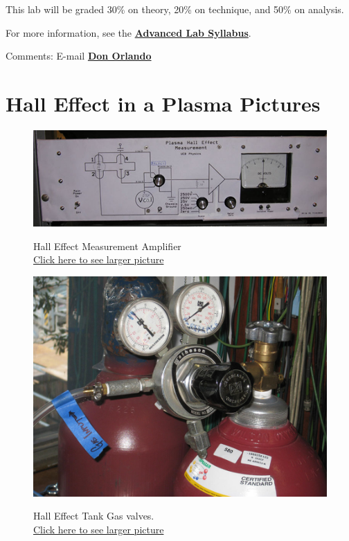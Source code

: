 \documentclass{../lab}
\begin{document}
This lab will be graded 30\% on theory, 20\% on technique, and 50\% on analysis.

For more information, see the \href{\AdvancedLabSyllabus}{\textbf{Advanced Lab Syllabus}}.

Comments: E-mail \href{\MailDonOrlando}{\textbf{Don Orlando}}

\section{Hall Effect in a Plasma Pictures}
\noindent
\begin{figure}[H]
\captionsetup{justification=centering}
  \href{http://experimentationlab.berkeley.edu/sites/default/files/images/HAL_0152B.jpg}{\includegraphics[width=\linewidth,keepaspectratio]{images/HAL_0152B.jpg}}
  \caption{Hall Effect Measurement Amplifier \\
  \href{http://experimentationlab.berkeley.edu/sites/default/files/images/HAL_0152B.jpg}{Click here to see larger picture}}
  \label{fig:HAL_0152B.jpg}
\endminipage\hfill
{}
  \href{http://experimentationlab.berkeley.edu/sites/default/files/images/HAL_Gas-Valves_3532-Lg.jpg}{\includegraphics[width=\linewidth,keepaspectratio]{images/HAL_Gas-Valves_3532-Lg.jpg}}
  \caption{Hall Effect Tank Gas valves. \\ \href{http://experimentationlab.berkeley.edu/sites/default/files/images/HAL_Gas-Valves_3532-Lg.jpg}{Click here to see larger picture}}\label{fig:HAL_Gas-Valves_3532-Lg.jpg}
\endminipage
\end{figure}
\end{document}
